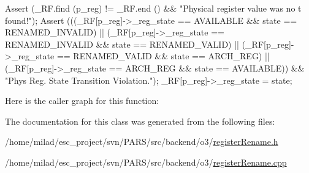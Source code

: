 \begin{DoxyCode}
                                                                    {
        Assert (_RF.find (p_reg) != _RF.end () && "Physical register value was no
      t found!");
        Assert (((_RF[p_reg]->_reg_state == AVAILABLE && state == 
      RENAMED_INVALID) ||
             (_RF[p_reg]->_reg_state == RENAMED_INVALID && state == 
      RENAMED_VALID) ||
                     (_RF[p_reg]->_reg_state == RENAMED_VALID && state == 
      ARCH_REG) ||
                     (_RF[p_reg]->_reg_state == ARCH_REG && state == AVAILABLE)) 
      &&
                     "Phys Reg. State Transition Violation.");
        _RF[p_reg]->_reg_state = state;
}
\end{DoxyCode}


Here is the caller graph for this function:




The documentation for this class was generated from the following files:\begin{DoxyCompactItemize}
\item 
/home/milad/esc\_\-project/svn/PARS/src/backend/o3/\hyperlink{backend_2o3_2registerRename_8h}{registerRename.h}\item 
/home/milad/esc\_\-project/svn/PARS/src/backend/o3/\hyperlink{backend_2o3_2registerRename_8cpp}{registerRename.cpp}\end{DoxyCompactItemize}

